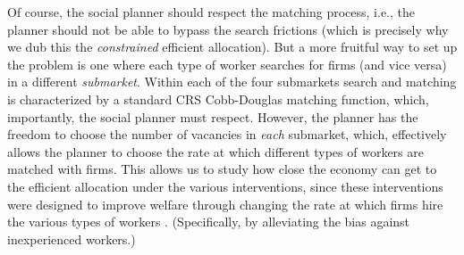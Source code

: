 \documentclass[12pt]{article} %
\theoremstyle{definition}
\begin{document}

Of course, the social planner should respect the matching process, i.e., the planner should not be able to bypass the search frictions (which is precisely why we dub this the \textit{constrained} efficient allocation). But a more fruitful way to set up the problem is one where each type of worker searches for firms (and vice versa) in a different \textit{submarket}. Within each of the four submarkets search and matching is characterized by a standard CRS Cobb-Douglas matching function, which, importantly, the social planner must respect. However, the planner has the freedom to choose the number of vacancies in \textit{each} submarket, which, effectively allows the planner to choose the rate at which different types of workers are matched with firms. This allows us to study how close the economy can get to the efficient allocation under the various interventions, since these interventions were designed to improve welfare through changing the rate at which firms hire the various types of workers . (Specifically, by alleviating the bias against inexperienced workers.) 
\end{document}
